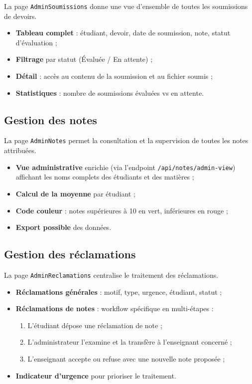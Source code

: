 La page \texttt{AdminSoumissions} donne une vue d'ensemble de toutes les soumissions de devoirs.

\begin{itemize}[noitemsep]
    \item \textbf{Tableau complet} : étudiant, devoir, date de soumission, note, statut d'évaluation ;
    \item \textbf{Filtrage} par statut (Évaluée / En attente) ;
    \item \textbf{Détail} : accès au contenu de la soumission et au fichier soumis ;
    \item \textbf{Statistiques} : nombre de soumissions évaluées vs en attente.
\end{itemize}

\subsection{Gestion des notes}

La page \texttt{AdminNotes} permet la consultation et la supervision de toutes les notes attribuées.

\begin{itemize}[noitemsep]
    \item \textbf{Vue administrative} enrichie (via l'endpoint \texttt{/api/notes/admin-view}) affichant les noms complets des étudiants et des matières ;
    \item \textbf{Calcul de la moyenne} par étudiant ;
    \item \textbf{Code couleur} : notes supérieures à 10 en vert, inférieures en rouge ;
    \item \textbf{Export possible} des données.
\end{itemize}

\subsection{Gestion des réclamations}

La page \texttt{AdminReclamations} centralise le traitement des réclamations.

\begin{itemize}[noitemsep]
    \item \textbf{Réclamations générales} : motif, type, urgence, étudiant, statut ;
    \item \textbf{Réclamations de notes} : workflow spécifique en multi-étapes :
    \begin{enumerate}[noitemsep]
        \item L'étudiant dépose une réclamation de note ;
        \item L'administrateur l'examine et la transfère à l'enseignant concerné ;
        \item L'enseignant accepte ou refuse avec une nouvelle note proposée ;
    \end{enumerate}
    \item \textbf{Indicateur d'urgence} pour prioriser le traitement.
\end{itemize}

